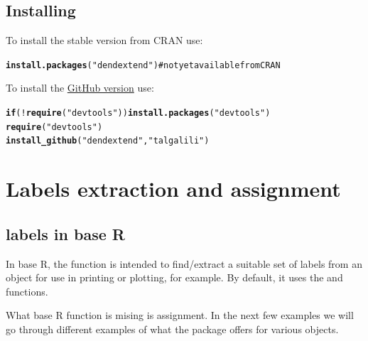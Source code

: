 \documentclass[shortnames,nojss,article]{jss}\usepackage{graphicx, color}
\makeatletter
\newcommand{\hlfunctioncall}[1]{\textcolor[rgb]{0.501960784313725,0,0.329411764705882}{\textbf{#1}}}%
\newcommand{\hlstring}[1]{\textcolor[rgb]{0.6,0.6,1}{#1}}%
\newenvironment{kframe}{%
 \def\at@end@of@kframe{}%
 \ifinner\ifhmode%
  \def\at@end@of@kframe{\end{minipage}}%
  \begin{minipage}{\columnwidth}%
 \fi\fi%
 \def\FrameCommand##1{\hskip\@totalleftmargin \hskip-\fboxsep
 \colorbox{shadecolor}{##1}\hskip-\fboxsep
     \hskip-\linewidth \hskip-\@totalleftmargin \hskip\columnwidth}%
 \MakeFramed {\advance\hsize-\width
   \@totalleftmargin\z@ \linewidth\hsize
   \@setminipage}}%
 {\par\unskip\endMakeFramed%
 \at@end@of@kframe}
\newenvironment{knitrout}{}{} %
\makeatother
\begin{document}
\subsection{Installing }

To install the stable version from CRAN use:

\begin{knitrout}
\color{fgcolor}\begin{kframe}
\begin{alltt}
\hlfunctioncall{install.packages}(\hlstring{"dendextend"})  # not yet available from CRAN
\end{alltt}
\end{kframe}
\end{knitrout}



To install the \href{https://github.com/talgalili/dendextend}{GitHub version} use:

\begin{knitrout}
\color{fgcolor}\begin{kframe}
\begin{alltt}
\hlfunctioncall{if} (!\hlfunctioncall{require}(\hlstring{"devtools"})) \hlfunctioncall{install.packages}(\hlstring{"devtools"})
\hlfunctioncall{require}(\hlstring{"devtools"})
\hlfunctioncall{install_github}(\hlstring{"dendextend"}, \hlstring{"talgalili"})
\end{alltt}
\end{kframe}
\end{knitrout}



\section{Labels extraction and assignment}


\subsection{labels in base R}

In base R, the  function is intended to find/extract a suitable set of labels from an object for use in printing or plotting, for example. By default, it uses the  and  functions.

What base R  function is mising is assignment. In the next few examples we will go through different examples of what the  package offers for various objects.
\end{document}
